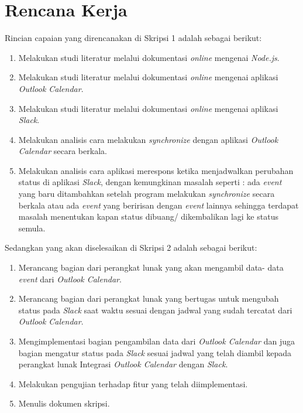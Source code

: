 \documentclass[a4paper,twoside]{article}
\begin{document}
\section{Rencana Kerja}
Rincian capaian yang direncanakan di Skripsi 1 adalah sebagai berikut:

\begin{enumerate}
\item Melakukan studi literatur melalui dokumentasi \textit{online} mengenai \textit{Node.js}.
		\item Melakukan studi literatur melalui dokumentasi \textit{online} mengenai aplikasi \textit{Outlook Calendar}.
		\item Melakukan studi literatur melalui dokumentasi \textit{online} mengenai aplikasi \textit{Slack}. 
		\item Melakukan analisis cara melakukan \textit{synchronize} dengan aplikasi \textit{Outlook Calendar} secara berkala.
		\item Melakukan analisis cara aplikasi merespons ketika menjadwalkan perubahan status di aplikasi \textit{Slack}, dengan kemungkinan masalah seperti : ada \textit{event} yang baru ditambahkan setelah program melakukan \textit{synchronize} secara berkala atau ada \textit{event} yang beririsan dengan \textit{event} lainnya sehingga terdapat masalah menentukan kapan status dibuang/ dikembalikan lagi ke status semula. 
\end{enumerate}

Sedangkan yang akan diselesaikan di Skripsi 2 adalah sebagai berikut:

\begin{enumerate}
\item Merancang bagian dari perangkat lunak yang akan mengambil data- data \textit{event} dari \textit{Outlook Calendar}. 
		\item Merancang bagian dari perangkat lunak yang bertugas untuk mengubah status pada \textit{Slack} saat waktu sesuai dengan jadwal yang sudah tercatat dari \textit{Outlook Calendar}.
		\item Mengimplementasi bagian pengambilan data dari \textit{Outlook Calendar} dan juga bagian mengatur status pada \textit{Slack} sesuai jadwal yang telah diambil kepada perangkat lunak Integrasi \textit{Outlook Calendar} dengan \textit{Slack}.
		\item Melakukan pengujian terhadap fitur yang telah diimplementasi.
		\item Menulis dokumen skripsi.
\end{enumerate}
\clearpage
\end{document}
